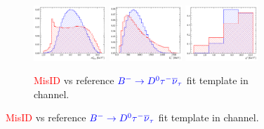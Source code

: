 \begin{figure}[!htb]
    \begin{subfigure}{\textwidth}
        \centering
        \includegraphics[width=0.3\textwidth]{figs-fit-fit-templates/histo-comp/D0_iso_D0Tau__vs__D0_iso_misID__m2miss.pdf}
        \includegraphics[width=0.3\textwidth]{figs-fit-fit-templates/histo-comp/D0_iso_D0Tau__vs__D0_iso_misID__el.pdf}
        \includegraphics[width=0.3\textwidth]{figs-fit-fit-templates/histo-comp/D0_iso_D0Tau__vs__D0_iso_misID__q2.pdf}
        \caption{
            \textcolor{red}{MisID} vs
            reference
            $\textcolor{blue}{{{{B}^-}} \rightarrow {\ensuremath{{D}^0}}{\ensuremath{\tau^-}}{\ensuremath{{\overline{\nu}}_\tau}}}$
            fit template in \Dz channel.
        }
    \end{subfigure}


\end{figure}
